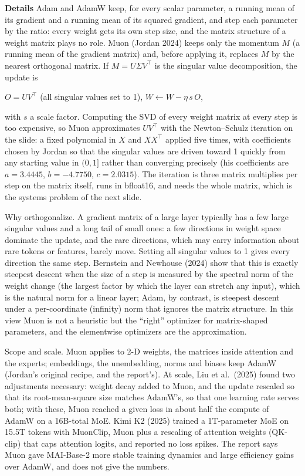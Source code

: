\documentclass[11pt,letterpaper]{article}
\newcommand{\para}[1]{\medskip\noindent\textbf{#1}\quad}
\newenvironment{formulas}{\begin{tcolorbox}[formulabox]}{\end{tcolorbox}}
\begin{document}
\para{Details} Adam and AdamW keep, for every scalar parameter, a running mean of its gradient and a running mean of its squared gradient, and step each parameter by the ratio: every weight gets its own step size, and the matrix structure of a weight matrix plays no role. Muon (Jordan 2024) keeps only the momentum $M$ (a running mean of the gradient matrix) and, before applying it, replaces $M$ by the nearest orthogonal matrix. If $M=U\Sigma V^{\top}$ is the singular value decomposition, the update is
\begin{formulas}
$O=UV^{\top}$ \quad (all singular values set to 1), \qquad $W\leftarrow W-\eta\,s\,O$,
\end{formulas}
with $s$ a scale factor. Computing the SVD of every weight matrix at every step is too expensive, so Muon approximates $UV^{\top}$ with the Newton--Schulz iteration on the slide: a fixed polynomial in $X$ and $XX^{\top}$ applied five times, with coefficients chosen by Jordan so that the singular values are driven toward 1 quickly from any starting value in $(0,1]$ rather than converging precisely (his coefficients are $a=3.4445$, $b=-4.7750$, $c=2.0315$). The iteration is three matrix multiplies per step on the matrix itself, runs in bfloat16, and needs the whole matrix, which is the systems problem of the next slide.

Why orthogonalize. A gradient matrix of a large layer typically has a few large singular values and a long tail of small ones: a few directions in weight space dominate the update, and the rare directions, which may carry information about rare tokens or features, barely move. Setting all singular values to 1 gives every direction the same step. Bernstein and Newhouse (2024) show that this is exactly steepest descent when the size of a step is measured by the spectral norm of the weight change (the largest factor by which the layer can stretch any input), which is the natural norm for a linear layer; Adam, by contrast, is steepest descent under a per-coordinate (infinity) norm that ignores the matrix structure. In this view Muon is not a heuristic but the ``right'' optimizer for matrix-shaped parameters, and the elementwise optimizers are the approximation.

Scope and scale. Muon applies to 2-D weights, the matrices inside attention and the experts; embeddings, the unembedding, norms and biases keep AdamW (Jordan's original recipe, and the report's). At scale, Liu et al.\ (2025) found two adjustments necessary: weight decay added to Muon, and the update rescaled so that its root-mean-square size matches AdamW's, so that one learning rate serves both; with these, Muon reached a given loss in about half the compute of AdamW on a 16B-total MoE. Kimi K2 (2025) trained a 1T-parameter MoE on 15.5T tokens with MuonClip, Muon plus a rescaling of attention weights (QK-clip) that caps attention logits, and reported no loss spikes. The report says Muon gave MAI-Base-2 more stable training dynamics and large efficiency gains over AdamW, and does not give the numbers.
\end{document}
